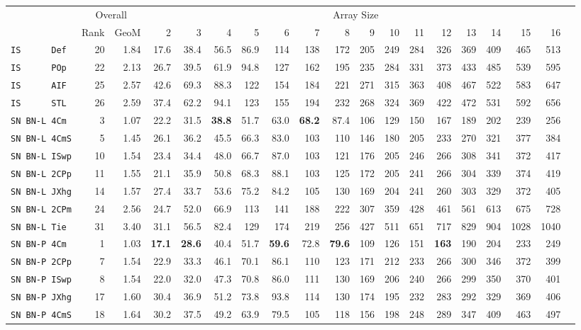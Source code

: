 \begin{tabular}{l | r @{~~} r | r@{~~}r@{~~}r@{~~}r@{~~}r@{~~}r@{~~}r@{~~}r@{~~}r@{~~}r@{~~}r@{~~}r@{~~}r@{~~}r@{~~}r@{~~}r|}
 & \multicolumn{2}{c|}{Overall} & \multicolumn{15}{c}{Array Size} \\
 & Rank & GeoM & 2&3&4&5&6&7&8&9&10&11&12&13&14&15&16\\ \hline
\verb+IS      Def+ & 20 & 1.84 & 17.6&38.4&56.5&86.9&114&138&172&205&249&284&326&369&409&465&513\\
\verb+IS      POp+ & 22 & 2.13 & 26.7&39.5&61.9&94.8&127&162&195&235&284&331&373&433&485&539&595\\
\verb+IS      AIF+ & 25 & 2.57 & 42.6&69.3&88.3&122&154&184&221&271&315&363&408&467&522&583&647\\
\verb+IS      STL+ & 26 & 2.59 & 37.4&62.2&94.1&123&155&194&232&268&324&369&422&472&531&592&656\smallskip \\
\verb+SN BN-L 4Cm + & 3 & 1.07 & 22.2&31.5&\textbf{38.8}&51.7&63.0&\textbf{68.2}&87.4&106&129&150&167&189&202&239&256\\
\verb+SN BN-L 4CmS+ & 5 & 1.45 & 26.1&36.2&45.5&66.3&83.0&103&110&146&180&205&233&270&321&377&384\\
\verb+SN BN-L ISwp+ & 10 & 1.54 & 23.4&34.4&48.0&66.7&87.0&103&121&176&205&246&266&308&341&372&417\\
\verb+SN BN-L 2CPp+ & 11 & 1.55 & 21.1&35.9&50.8&68.3&88.1&103&125&172&205&241&266&304&339&374&419\\
\verb+SN BN-L JXhg+ & 14 & 1.57 & 27.4&33.7&53.6&75.2&84.2&105&130&169&204&241&260&303&329&372&405\\
\verb+SN BN-L 2CPm+ & 24 & 2.56 & 24.7&52.0&66.9&113&141&188&222&307&359&428&461&561&613&675&728\\
\verb+SN BN-L Tie + & 31 & 3.40 & 31.1&56.5&82.4&129&174&219&256&427&511&651&717&829&904&1028&1040\smallskip \\
\verb+SN BN-P 4Cm + & 1 & 1.03 & \textbf{17.1}&\textbf{28.6}&40.4&51.7&\textbf{59.6}&72.8&\textbf{79.6}&109&126&151&\textbf{163}&190&204&233&249\\
\verb+SN BN-P 2CPp+ & 7 & 1.54 & 22.9&33.3&46.1&70.1&86.1&110&123&171&212&233&266&300&346&372&399\\
\verb+SN BN-P ISwp+ & 8 & 1.54 & 22.0&32.0&47.3&70.8&86.0&111&130&169&206&240&266&299&350&370&401\\
\verb+SN BN-P JXhg+ & 17 & 1.60 & 30.4&36.9&51.2&73.8&93.8&114&130&174&195&232&283&292&329&369&406\\
\verb+SN BN-P 4CmS+ & 18 & 1.64 & 30.2&37.5&49.2&63.9&79.5&105&118&156&198&248&289&347&409&463&497\\

\end{tabular}
